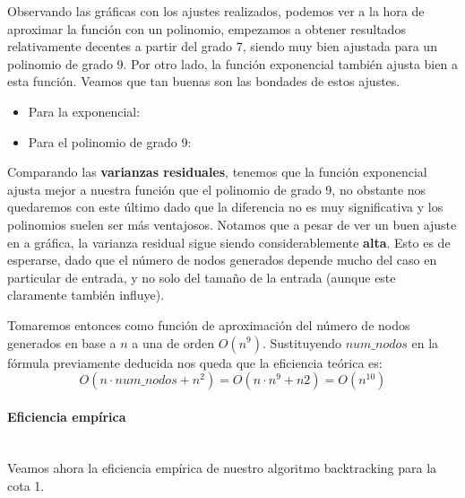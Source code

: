 \documentclass{article}
\newcommand{\myparagraph}[1]{\paragraph{#1}\mbox{}\\}
\begin{document}
Observando las gráficas con los ajustes realizados, podemos ver a la hora de aproximar la función con un polinomio, empezamos a obtener resultados relativamente decentes a partir del grado 7, siendo muy bien ajustada para un polinomio de grado 9. Por otro lado, la función exponencial también ajusta bien a esta función. Veamos que tan buenas son las bondades de estos ajustes.
\begin{itemize}
    \item Para la exponencial:

     \item Para el polinomio de grado 9:

\end{itemize}

Comparando las \textbf{varianzas residuales}, tenemos que la función exponencial ajusta mejor a nuestra función que el polinomio de grado 9, no obstante nos quedaremos con este último dado que la diferencia no es muy significativa y los polinomios suelen ser más ventajosos. Notamos que a pesar de ver un buen ajuste en a gráfica, la varianza residual sigue siendo considerablemente \textbf{alta}. Esto es de esperarse, dado que el número de nodos generados depende mucho del caso en particular de entrada, y no solo del tamaño de la entrada (aunque este claramente también influye).

Tomaremos entonces como función de aproximación del número de nodos generados en base a $n$ a una de orden $O(n^{9})$. Sustituyendo $num\_nodos$
en la fórmula previamente deducida nos queda que la eficiencia teórica es:
\begin{equation*}
    O(n\cdot num\_nodos + n^{2}) = O(n\cdot n^{9} + n{2}) = O(n^{10})
\end{equation*}

\myparagraph{Eficiencia empírica}

Veamos ahora la eficiencia empírica de nuestro algoritmo backtracking para la cota 1.
\end{document}
